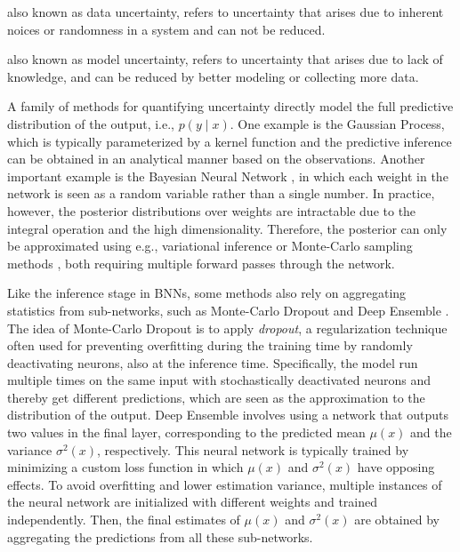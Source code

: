 \begin{description}[leftmargin=0cm]
\item[Aleatory Uncertainty:] also known as data uncertainty, refers to uncertainty that arises due to inherent noices or randomness in a system and can not be reduced. \item[Epistemic Uncertainty:] also known as model uncertainty, refers to uncertainty that arises due to lack of knowledge, and can be reduced by better modeling or collecting more data.
\end{description}

A family of methods for quantifying uncertainty directly model the full predictive distribution of the output, i.e., $p(y \mid x)$. One example is the Gaussian Process, which is typically parameterized by a kernel function and the predictive inference can be obtained in an analytical manner based on the observations. Another important example is the Bayesian Neural Network \cite{kendall2017uncertainties, neal1996bayesian}, in which each weight in the network is seen as a random variable rather than a single number. In practice, however, the posterior distributions over weights are intractable due to the integral operation and the high dimensionality. Therefore, the posterior can only be approximated using e.g.,  variational inference or Monte-Carlo sampling methods \cite{neal1996bayesian, springenberg2016bayesian}, both requiring multiple forward passes through the network. 

Like the inference stage in BNNs, some methods also rely on aggregating statistics from sub-networks, such as Monte-Carlo Dropout \cite{gal2016dropout} and Deep Ensemble \cite{lakshminarayanan2017simple}. The idea of Monte-Carlo Dropout is to apply \textit{dropout}, a regularization technique often used for preventing overfitting during the training time by randomly deactivating neurons, also at the inference time. Specifically, the model run multiple times on the same input with stochastically deactivated neurons and thereby get  different predictions, which are seen as the approximation to the distribution of the output. Deep Ensemble involves using a network that outputs two values in the final layer, corresponding to the predicted mean $\mu(x)$ and the variance $\sigma^2(x)$, respectively. This neural network is typically trained by minimizing a custom loss function in which $\mu(x)$ and $\sigma^2(x)$ have opposing effects. To avoid overfitting and lower estimation variance, multiple instances of the neural network are initialized with different weights and trained independently. Then, the final estimates of $\mu(x)$ and $\sigma^2(x)$ are obtained by aggregating the predictions from all these sub-networks. 

